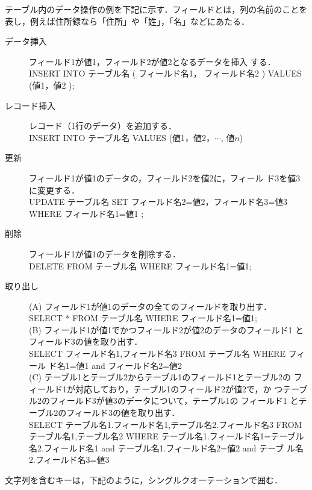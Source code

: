 テーブル内のデータ操作の例を下記に示す．フィールドとは，列の名前のことを
表し，例えば住所録なら「住所」や「姓」，「名」などにあたる．
\begin{description}
 \item[データ挿入] フィールド1が値1，フィールド2が値2となるデータを挿入
	    する．\\
       INSERT INTO テーブル名 ( フィールド名1， フィールド名2 ) VALUES
       (値1，値2 );
 \item[レコード挿入] レコード（1行のデータ）を追加する．\\
       INSERT INTO テーブル名 VALUES (値1，値2，$\cdots$, 値$n$)
 \item[更新]  フィールド1が値1のデータの，フィールド2を値2に，フィール
	    ド3を値3に変更する．\\
       UPDATE テーブル名 SET フィールド名2=値2，フィールド名3=値3 WHERE
       フィールド名1=値1 ;
 \item[削除] フィールド1が値1のデータを削除する．\\
       DELETE FROM テーブル名 WHERE フィールド名1=値1;
 \item[取り出し] (A) フィールド1が値1のデータの全てのフィールドを取り出す．\\
       SELECT * FROM テーブル名 WHERE フィールド名1=値1;\\

	(B) フィールド1が値1でかつフィールド2が値2のデータのフィールド1
	    とフィールド3の値を取り出す．\\

       SELECT フィールド名1,フィールド名3 FROM テーブル名 WHERE フィール
	    ド名1=値1 and フィールド名2=値2\\

	(C) テーブル1とテーブル2からテーブル1のフィールド1とテーブル2の
	    フィールド1が対応しており，テーブル1のフィールド2が値2で，か
	    つテーブル2のフィールド3が値3のデータについて，テーブル1の
	    フィールド1 とテーブル2のフィールド3の値を取り出す．\\

       SELECT テーブル名1.フィールド名1,テーブル名2.フィールド名3 FROM
	    テーブル名1,テーブル名2 WHERE テーブル名1.フィールド名1=テーブル
	    名2.フィールド名1 and テーブル名1.フィールド名2=値2 and テーブ
	    ル名2.フィールド名3=値3 \\

\end{description}

文字列を含むキーは，下記のように，シングルクオーテーションで囲む．

